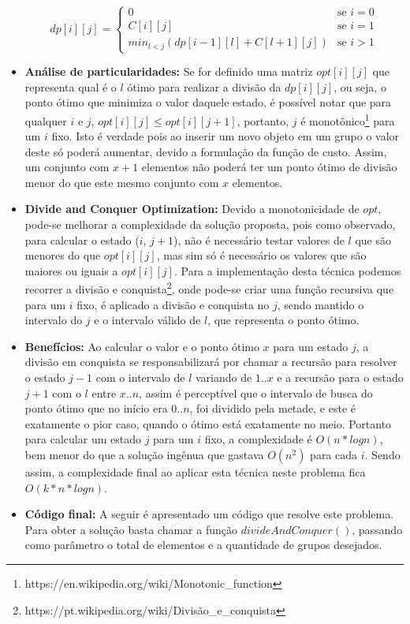 \begin{itemize}
\begin{equation}
dp[i][j] =
\begin{cases}
0 &\text{se } i = 0 \\
C[i][j] &\text{se } i = 1 \\
min_{l < j}(dp[i-1][l] + C[l+1][j]) &\text{se } i > 1
\end{cases}
\label{eq:dc1}
\end{equation}

\item \textbf{Análise de particularidades:} 
Se for definido uma matriz $opt[i][j]$ que representa qual é o $l$ ótimo para realizar a divisão da $dp[i][j]$, ou seja, o ponto ótimo que minimiza o valor daquele estado, é possível notar que para qualquer $i$ e $j$, $opt[i][j] \leq opt[i][j+1]$, portanto, $j$ é monotônico\footnote{https://en.wikipedia.org/wiki/Monotonic\_function} para um $i$ fixo. Isto é verdade pois ao inserir um novo objeto em um grupo o valor deste só poderá aumentar, devido a formulação da função de custo. Assim, um conjunto com $x+1$ elementos não poderá ter um ponto ótimo de divisão menor do que este mesmo conjunto com $x$ elementos.

\item \textbf{Divide and Conquer Optimization:} Devido a monotonicidade de $opt$, pode-se melhorar a complexidade da solução proposta, pois como observado, para calcular o estado ($i$, $j+1$), não é necessário testar valores de $l$ que são menores do que $opt[i][j]$, mas sim só é necessário os valores que são maiores ou iguais a $opt[i][j]$. Para a implementação desta técnica podemos recorrer a divisão e conquista\footnote{https://pt.wikipedia.org/wiki/Divisão\_e\_conquista}, onde pode-se criar uma função recursiva que para um $i$ fixo, é aplicado a divisão e conquista no $j$, sendo mantido o intervalo do $j$ e o intervalo válido de $l$, que representa o ponto ótimo.

\item \textbf{Benefícios:} Ao calcular o valor e o ponto ótimo $x$ para um estado $j$, a divisão em conquista se responsabilizará por chamar a recursão para resolver o estado $j-1$ com o intervalo de $l$ variando de $1..x$ e a recursão para o estado $j+1$ com o $l$ entre $x..n$, assim é perceptível que o intervalo de busca do ponto ótimo que no início era $0..n$, foi dividido pela metade, e este é exatamente o pior caso, quando o ótimo está exatamente no meio. Portanto para calcular um estado $j$ para um $i$ fixo, a complexidade é $O(n*logn)$, bem menor do que a solução ingênua que gastava $O(n^2)$ para cada $i$. Sendo assim, a complexidade final ao aplicar esta técnica neste problema fica $O(k*n*logn)$.
\item \textbf{Código final:} A seguir é apresentado um código que resolve este problema. Para obter a solução basta chamar a função $divideAndConquer()$, passando como parâmetro o total de elementos e a quantidade de grupos desejados.
\\


\end{itemize}
